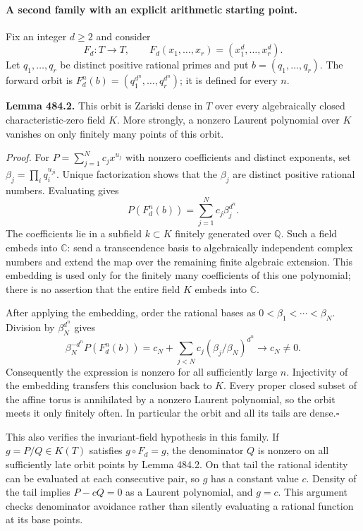 \documentclass[11pt]{article}
\begin{document}
\paragraph{A second family with an explicit arithmetic starting point.}
Fix an integer $d\ge2$ and consider
\[
 F_d:T\longrightarrow T,\qquad F_d(x_1,\ldots,x_r)
                              =(x_1^d,\ldots,x_r^d).
\]
Let $q_1,\ldots,q_r$ be distinct positive rational primes and put
$b=(q_1,\ldots,q_r)$. The forward orbit is
$F_d^n(b)=(q_1^{d^n},\ldots,q_r^{d^n})$; it is defined for every $n$.

\textbf{Lemma 484.2.}
This orbit is Zariski dense in $T$ over every algebraically closed
characteristic-zero field $K$. More strongly, a nonzero Laurent polynomial
over $K$ vanishes on only finitely many points of this orbit.

\emph{Proof.}
For $P=\sum_{j=1}^N c_jx^{u_j}$ with nonzero coefficients and distinct
exponents, set $\beta_j=\prod_iq_i^{u_{ji}}$. Unique factorization shows
that the $\beta_j$ are distinct positive rational numbers. Evaluating gives
\[
 P(F_d^n(b))=\sum_{j=1}^N c_j\beta_j^{d^n}.
\]
The coefficients lie in a subfield $k\subset K$ finitely generated over
$\mathbb Q$. Such a field embeds into $\mathbb C$: send a transcendence
basis to algebraically independent complex numbers and extend the map
over the remaining finite algebraic extension. This embedding is used
only for the finitely many coefficients of this one polynomial; there is
no assertion that the entire field $K$ embeds into $\mathbb C$.

After applying the embedding, order the rational bases as
$0<\beta_1<\cdots<\beta_N$. Division by $\beta_N^{d^n}$ gives
\[
 \beta_N^{-d^n}P(F_d^n(b))
 =c_N+\sum_{j<N}c_j(\beta_j/\beta_N)^{d^n}\longrightarrow c_N\ne0.
\]
Consequently the expression is nonzero for all sufficiently large $n$.
Injectivity of the embedding transfers this conclusion back to $K$.
Every proper closed subset of the affine torus is annihilated by a nonzero
Laurent polynomial, so the orbit meets it only finitely often. In
particular the orbit and all its tails are dense.\hfill$\square$

This also verifies the invariant-field hypothesis in this family. If
$g=P/Q\in K(T)$ satisfies $g\circ F_d=g$, the denominator $Q$ is nonzero
on all sufficiently late orbit points by Lemma 484.2. On that tail the
rational identity can be evaluated at each consecutive pair, so $g$ has a
constant value $c$. Density of the tail implies $P-cQ=0$ as a Laurent
polynomial, and $g=c$. This argument checks denominator avoidance rather
than silently evaluating a rational function at its base points.
\end{document}
